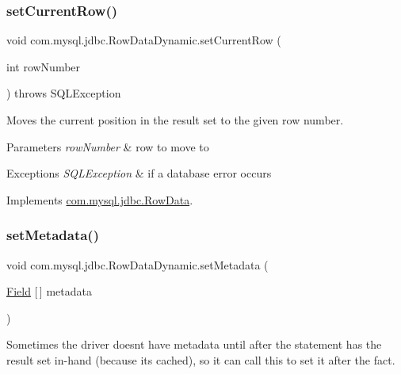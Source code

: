\subsubsection{\texorpdfstring{set\+Current\+Row()}{setCurrentRow()}}
{\footnotesize\ttfamily void com.\+mysql.\+jdbc.\+Row\+Data\+Dynamic.\+set\+Current\+Row (\begin{DoxyParamCaption}\item[{int}]{row\+Number }\end{DoxyParamCaption}) throws S\+Q\+L\+Exception}

Moves the current position in the result set to the given row number.


\begin{DoxyParams}{Parameters}
{\em row\+Number} & row to move to \\
\hline
\end{DoxyParams}

\begin{DoxyExceptions}{Exceptions}
{\em S\+Q\+L\+Exception} & if a database error occurs \\
\hline
\end{DoxyExceptions}


Implements \mbox{\hyperlink{interfacecom_1_1mysql_1_1jdbc_1_1_row_data_af1db64feefc1ecf2db53a72ec6063839}{com.\+mysql.\+jdbc.\+Row\+Data}}.

\mbox{\label{classcom_1_1mysql_1_1jdbc_1_1_row_data_dynamic_a49f5410d7de8866f83072ff1a5cd7bcc}} 
\subsubsection{\texorpdfstring{set\+Metadata()}{setMetadata()}}
{\footnotesize\ttfamily void com.\+mysql.\+jdbc.\+Row\+Data\+Dynamic.\+set\+Metadata (\begin{DoxyParamCaption}\item[{\mbox{\hyperlink{classcom_1_1mysql_1_1jdbc_1_1_field}{Field}} \mbox{[}$\,$\mbox{]}}]{metadata }\end{DoxyParamCaption})}

Sometimes the driver doesn\textquotesingle{}t have metadata until after the statement has the result set in-\/hand (because it\textquotesingle{}s cached), so it can call this to set it after the fact.


